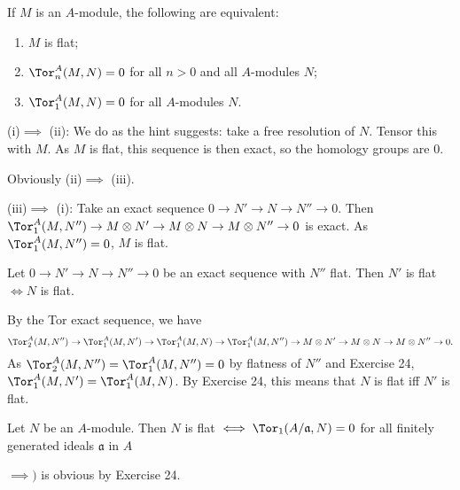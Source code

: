 \documentclass[a4paper]{exam}
\newif\ifhint
\begin{document}
\begin{questions}
	If $M$ is an $A$-module, the following are equivalent:
	\begin{enumerate}
		\item $M$ is flat;
		\item $\Tor^A_n(M,N) = 0$ for all $n > 0$ and all $A$-modules $N $;
		\item $\Tor_1^A(M,N) = 0$ for all $A$-modules $N$.
	\end{enumerate}
	\ifhint
		To show that (i)$\implies$ (ii), take a free resolution of $N$ and tensor it with $M$. Since $M$ is flat, the resulting sequence is exact and therefore its homology groups, which are the $\Tor^A_n(M,N)$ are zero for $n > 0$. To show that (iii) $\implies$ (i), let $0\to N' \to N \to N''\to 0$ be an exact sequence. Then from the $\Tor$ exact sequence,
		\[
			\Tor_1(M,N'') \to M \otimes N' \to M \otimes N \to M \otimes N'' \to 0
		\]
		is exact. Since $\Tor_1(M,N'') = 0 $, it follows that $M$ is flat.
	\fi
	\begin{solution}
		(i)$\implies$ (ii):
		We do as the hint suggests: take a free resolution of $N$.
		Tensor this with $M$.
		As $M$ is flat, this sequence is then exact, so the homology groups are 0.

		Obviously (ii)$\implies$ (iii).

		(iii)$\implies$ (i):
		Take an exact sequence $0\to N' \to N \to N'' \to 0$.
		Then $\Tor_1^A(M,N'') \to M \otimes N' \to M \otimes N \to M \otimes N'' \to 0$ is exact.
		As $\Tor_1^A(M,N'') = 0 $, $M$ is flat.
	\end{solution}

	\question Let $0\to N'\to N\to N''\to 0$ be an exact sequence with $N''$ flat. Then $N'$ is flat $\iff N$ is flat.
	\ifhint
		Use Exercise 24 and the Tor exact sequence.
	\fi
	\begin{solution}
		By the Tor exact sequence, we have
		\[
			\Tor_2^A(M,N'') \to \Tor_1^A(M,N') \to \Tor_1^A(M,N) \to \Tor_1^A(M,N'') \to M \otimes  N' \to M \otimes N \to M \otimes N'' \to 0
		.\]
		As $\Tor_2^A(M,N'') = \Tor_1^A(M,N'') = 0$ by flatness of $N''$ and Exercise 24, $\Tor_1^A(M,N') = \Tor_1^A(M, N)$.
		By Exercise 24, this means that $N$ is flat iff $N'$ is flat.
	\end{solution}

	\question Let $N$ be an $A$-module. Then $N$ is flat $\iff \Tor_1(A / \mathfrak{a}, N) = 0$ for all finitely generated ideals $\mathfrak{a}$ in $A $
	\ifhint
		Show first that $N$ is flat if $\Tor_1(M, N) = 0$ for all finitely generated $A$-modules $M $, by using (2.19). If $M$ is finitely generated, let $x_1, \cdots , x_n$ be a set of generators of $M $, and let $M $, be the submodule generated by $x_{1}, \ldots ,x_i$. By considering the successive quotients $M_i/M_{i-1}$ and using Exercise 25, deduce that $N$ is fiat if $\Tor_l(M, N) = 0$ for all cyclic $A$-modules $M $, i.e., all $M$ generated by a single element, and therefore of the form $A/\mathfrak{a}$ for some ideal $\mathfrak{a}$. Finally use (2.19) again to reduce to the case where $\mathfrak{a}$ is a finitely generated ideal.
		\fi
	\begin{solution}
		$\implies)$ is obvious by Exercise 24.


\end{solution}
\end{questions}
\end{document}
